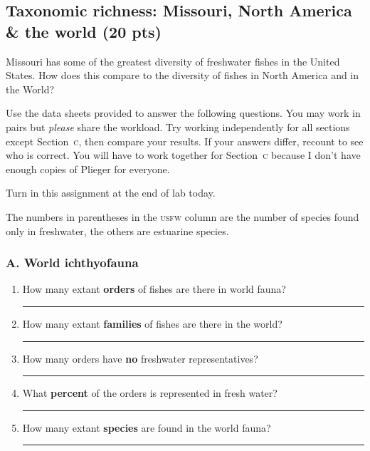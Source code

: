 \documentclass[12pt]{exam}
\newcommand{\shortblank}{\quad\rule{0.5in}{0.4pt}}
\begin{document}
\subsection*{Taxonomic richness: Missouri, North America \& the world (20 pts)}

Missouri has some of the greatest diversity of freshwater fishes in the United
States. How does this compare to the diversity of fishes in North
America and in the World?

Use the data sheets provided to answer the following questions. You may work in pairs
but \emph{please} share the workload. Try working independently for all sections except
Section~\textsc{c}, then compare your results. If your answers differ, recount to see who is correct. You will have to work together for Section~\textsc{c} because I don't have enough copies of Plieger for everyone.


Turn in this assignment at the end of lab today. 

The numbers in parentheses in the \textsc{usfw} column are the number of species
found only in freshwater, the others are estuarine species.

\vspace{0.5cm}

\subsubsection*{A. World ichthyofauna}

\begin{enumerate}
\item How many extant \textbf{orders} of fishes are there in world fauna? \shortblank

\item How many extant \textbf{families} of fishes are there in the world? \shortblank

\item How many orders have \textbf{no} freshwater representatives? \shortblank

\item What \textbf{percent} of the orders is represented in fresh water? \shortblank

\item How many extant \textbf{species} are found in the world fauna? \shortblank

\end{enumerate}

\vspace{1cm}
\end{document}
